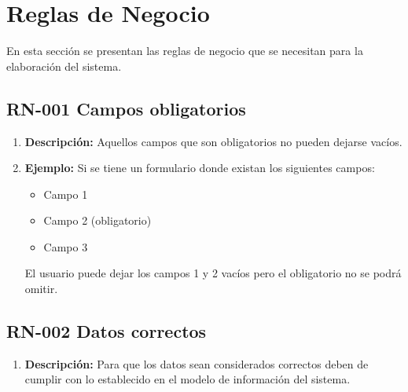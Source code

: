 \section{Reglas de Negocio}
En esta sección se presentan las reglas de negocio que se necesitan para la elaboración del sistema.
\subsection{RN-001 Campos obligatorios} \label{RN001}
    \begin{enumerate}[label= ]
        \item \textbf{Descripción:} Aquellos campos que son obligatorios no pueden dejarse vacíos.
        \item \textbf{Ejemplo:} Si se tiene un formulario donde existan los siguientes campos:
        \begin{itemize}
            \item Campo 1
            \item Campo 2 (obligatorio)
            \item Campo 3
        \end{itemize}
        El usuario puede dejar los campos 1 y 2 vacíos pero el obligatorio no se podrá omitir.
    \end{enumerate}
    
\subsection{RN-002 Datos correctos} \label{RN002}
    \begin{enumerate}[label= ]
        \item \textbf{Descripción:} Para que los datos sean considerados correctos deben de cumplir con lo establecido en el modelo de información del sistema.
    \end{enumerate}

